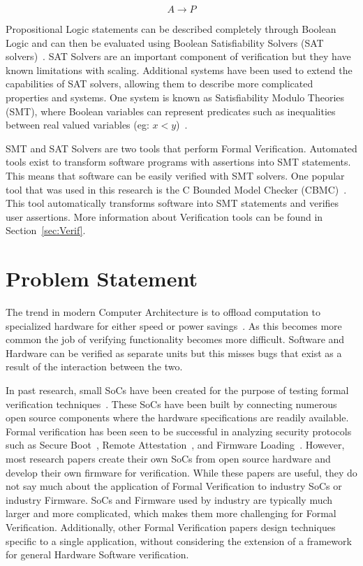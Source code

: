 \begin{equation}
    A \to P
\end{equation}

Propositional Logic statements can be described completely
through Boolean Logic and can then be evaluated using Boolean Satisfiability
Solvers (SAT solvers)~\cite{validating-sat}. 
SAT Solvers are an important component of verification but they have known limitations with scaling.
Additional systems have been used to extend the capabilities of SAT solvers, allowing them to describe more complicated properties and systems. 
One system is known as Satisfiability Modulo Theories (SMT), where 
Boolean variables can represent predicates such as inequalities between real valued variables (eg:
$x < y$)~\cite{smt}. 

SMT and SAT Solvers are two tools that perform Formal Verification. 
Automated tools exist to transform software programs with assertions into SMT statements.
This means that software can be easily verified with SMT solvers.
One popular tool that was used in this research is the C Bounded Model Checker (CBMC)~\cite{cbmc}. 
This tool automatically transforms software into SMT statements and verifies
user assertions.
More information about Verification tools can be found in
Section~\ref{sec:Verif}. 

\section{Problem Statement}

The trend in modern Computer Architecture is to offload computation to specialized hardware for either speed or power savings~\cite{hardware-accel}.
As this becomes more common the job of verifying functionality becomes more difficult.
Software and Hardware can be verified as separate units but this misses bugs
that exist as a result of the interaction between the two.

In past research, small SoCs have been created for the purpose of testing formal verification techniques~\cite{elane}.
These SoCs have been built by connecting numerous open source components where the hardware specifications are readily available.
Formal verification has been seen to be successful in analyzing security
protocols such as Secure Boot~\cite{elane}, Remote
Attestation~\cite{trustfound}, and Firmware Loading~\cite{load-protocol}. 
However, most research papers create their own SoCs from open source hardware
and develop their own firmware for verification.
While these papers are useful, they do not say much about the application of
Formal Verification to industry SoCs or industry Firmware.
SoCs and Firmware used by industry are typically much larger and more
complicated, which makes them more challenging for Formal Verification.
Additionally, other Formal Verification papers design techniques specific to a
single application, without considering the extension of a framework for
general Hardware Software verification.

